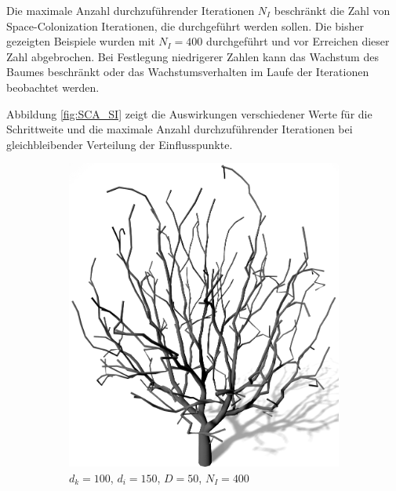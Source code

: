 Die maximale Anzahl durchzuführender Iterationen $N_I$ beschränkt die Zahl von Space-Colonization Iterationen, die durchgeführt werden sollen. Die bisher gezeigten Beispiele wurden mit $N_I = 400$ durchgeführt und vor Erreichen dieser Zahl abgebrochen. Bei Festlegung niedrigerer Zahlen kann das Wachstum des Baumes beschränkt oder das Wachstumsverhalten im Laufe der Iterationen beobachtet werden.

Abbildung \ref{fig:SCA_SI} zeigt die Auswirkungen verschiedener Werte für die Schrittweite und die maximale Anzahl durchzuführender Iterationen bei gleichbleibender Verteilung der Einflusspunkte.

\begin{figure} [hbtp]
	\centering
	\begin{subfigure}[t]{.45\textwidth}
		\centering
		\includegraphics[height=.21\textheight]{images/SCA_SI_SchrittweiteHigh.png}
		\caption{$d_k = 100$, $d_i = 150$, $D = 50$, $N_I = 400$}
		\label{subfig:SCA_SI_SchrittweiteHigh}
	\end{subfigure}
	\hspace{.01\linewidth}
	\begin{subfigure}[t]{.45\textwidth}
		\centering

\end{subfigure}
\end{figure}

